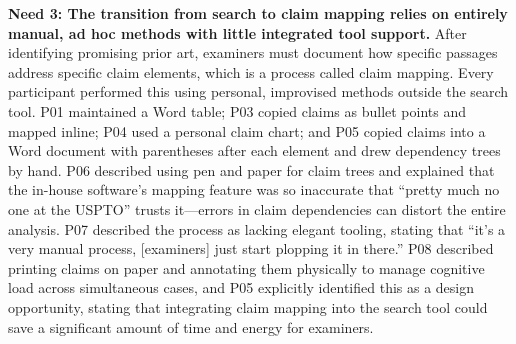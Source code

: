 \documentclass[sigconf]{acmart}
\begin{document}
\smallskip\noindent\textbf{Need 3: The transition from search to claim
mapping relies on entirely manual, ad hoc methods with little integrated tool
support.}
After identifying promising prior art, examiners must document how specific
passages address specific claim elements, which is a process called claim
mapping. Every participant performed this using personal, improvised methods
outside the search tool. P01 maintained a Word table; P03 copied claims as
bullet points and mapped inline; P04 used a personal claim chart; and P05
copied claims into a Word document with parentheses after each element and
drew dependency trees by hand. P06 described using pen and paper for claim
trees and explained that the in-house software's mapping feature was so
inaccurate that ``pretty much no one at the USPTO'' trusts it---errors in
claim dependencies can distort the entire analysis. P07 described the process
as lacking elegant tooling, stating that ``it's a very manual process,
[examiners] just start plopping it in there.'' P08 described printing claims
on paper and annotating them physically to manage cognitive load across
simultaneous cases, and P05 explicitly identified this as a design
opportunity, stating that integrating claim mapping into the search tool could
save a significant amount of time and energy for examiners.
\end{document}

